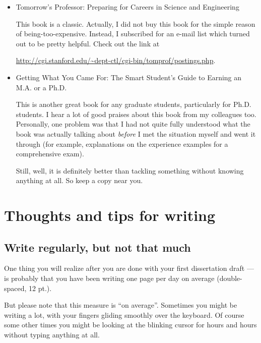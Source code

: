 \documentclass[11pt]{article}
\begin{document}
\begin{itemize}
    \item Tomorrow's Professor: Preparing for Careers in Science and
        Engineering

        This book is a classic. Actually, I did not buy this book for the
        simple reason of being-too-expensive. Instead, I 
        subscribed for an e-mail list which turned out to be pretty helpful. 
        Check out the link at
        \begin{small}\url{http://cgi.stanford.edu/\~dept-ctl/cgi-bin/tomprof/postings.php}.\end{small}

    \item Getting What You Came For: The Smart Student's Guide to Earning an
        M.A. or a Ph.D.

        This is another great book for any graduate students, particularly for
        Ph.D. students. I hear a lot of good praises about this book from my
        colleagues too. Personally, one problem was that I had not quite fully
        understood what the book was actually talking about \emph{before} I
        met the situation myself and went it through (for example,
        explanations on the experience examples for a comprehensive exam). 

        Still, well, it is definitely better than tackling something without
        knowing anything at all. So keep a copy near you.

\end{itemize}


\section{Thoughts and tips for writing}

\subsection{Write regularly, but not that much}
One thing you will realize after you are done with your first dissertation
draft --- is probably that you have been writing one page per day on average
(double-spaced, 12 pt.).

But please note that this measure is ``on average''. Sometimes you might be
writing a lot, with your fingers gliding smoothly over the keyboard.  Of
course some other times you might be looking at the blinking cursor for hours
and hours without typing anything at all. 
\end{document}
